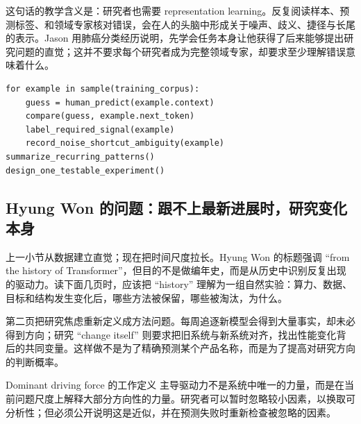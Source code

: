 
这句话的教学含义是：研究者也需要 representation learning。反复阅读样本、预测标签、和领域专家核对错误，会在人的头脑中形成关于噪声、歧义、捷径与长尾的表示。Jason 用肺癌分类经历说明，先学会任务本身让他获得了后来能够提出研究问题的直觉；这并不要求每个研究者成为完整领域专家，却要求至少理解错误意味着什么。

\begin{lstlisting}[caption={Manual data inspection 的最小研究循环}]
for example in sample(training_corpus):
    guess = human_predict(example.context)
    compare(guess, example.next_token)
    label_required_signal(example)
    record_noise_shortcut_ambiguity(example)
summarize_recurring_patterns()
design_one_testable_experiment()
\end{lstlisting}

\subsection{Hyung Won 的问题：跟不上最新进展时，研究变化本身}

上一小节从数据建立直觉；现在把时间尺度拉长。Hyung Won 的标题强调 ``from the history of Transformer''，但目的不是做编年史，而是从历史中识别反复出现的驱动力。读下面几页时，应该把 ``history'' 理解为一组自然实验：算力、数据、目标和结构发生变化后，哪些方法被保留，哪些被淘汰，为什么。



第二页把研究焦虑重新定义成方法问题。每周追逐新模型会得到大量事实，却未必得到方向；研究 ``change itself'' 则要求把旧系统与新系统对齐，找出性能变化背后的共同变量。这样做不是为了精确预测某个产品名称，而是为了提高对研究方向的判断概率。



\begin{importantbox}{Dominant driving force 的工作定义}
主导驱动力不是系统中唯一的力量，而是在当前问题尺度上解释大部分方向性的力量。研究者可以暂时忽略较小因素，以换取可分析性；但必须公开说明这是近似，并在预测失败时重新检查被忽略的因素。
\end{importantbox}

